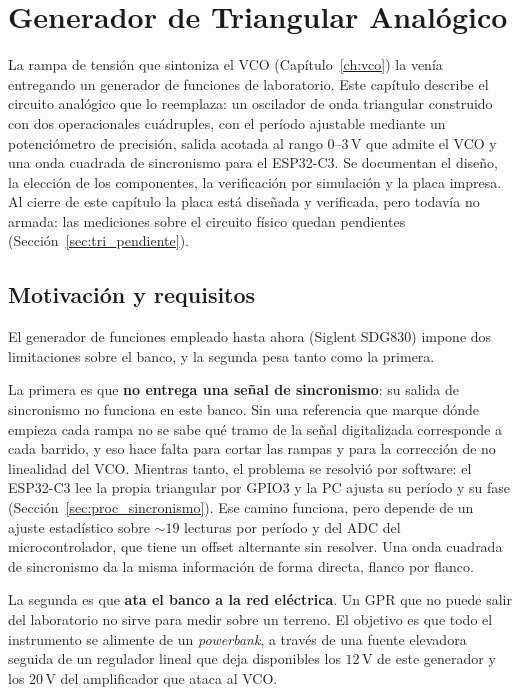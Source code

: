 \documentclass[12pt, a4paper, twoside]{report}
\begin{document}
\chapter{Generador de Triangular Analógico}
\label{ch:triangular}

La rampa de tensión que sintoniza el VCO (Capítulo~\ref{ch:vco}) la venía
entregando un generador de funciones de laboratorio. Este capítulo describe
el circuito analógico que lo reemplaza: un oscilador de onda triangular
construido con dos operacionales cuádruples, con el período ajustable
mediante un potenciómetro de precisión, salida acotada al rango
$0$--$3\,\text{V}$ que admite el VCO y una onda cuadrada de sincronismo para
el ESP32-C3. Se documentan el diseño, la elección de los componentes, la
verificación por simulación y la placa impresa. Al cierre de este capítulo
la placa está diseñada y verificada, pero todavía no armada: las mediciones
sobre el circuito físico quedan pendientes
(Sección~\ref{sec:tri_pendiente}).

\section{Motivación y requisitos}
\label{sec:tri_requisitos}

El generador de funciones empleado hasta ahora (Siglent SDG830) impone dos
limitaciones sobre el banco, y la segunda pesa tanto como la primera.

La primera es que \textbf{no entrega una señal de sincronismo}: su salida
de sincronismo no funciona en este banco. Sin una referencia que marque
dónde empieza cada rampa no se sabe qué tramo de la señal digitalizada
corresponde a cada barrido, y eso hace falta para cortar las rampas y para
la corrección de no linealidad del VCO. Mientras tanto, el problema se
resolvió por software: el ESP32-C3 lee la propia triangular por GPIO3 y la
PC ajusta su período y su fase (Sección~\ref{sec:proc_sincronismo}). Ese
camino funciona, pero depende de un ajuste estadístico sobre $\sim 19$
lecturas por período y del ADC del microcontrolador, que tiene un offset
alternante sin resolver. Una onda cuadrada de sincronismo da la misma
información de forma directa, flanco por flanco.

La segunda es que \textbf{ata el banco a la red eléctrica}. Un GPR que no
puede salir del laboratorio no sirve para medir sobre un terreno. El
objetivo es que todo el instrumento se alimente de un \textit{powerbank}, a
través de una fuente elevadora seguida de un regulador lineal que deja
disponibles los $12\,\text{V}$ de este generador y los $20\,\text{V}$ del
amplificador que ataca al VCO.
\end{document}
